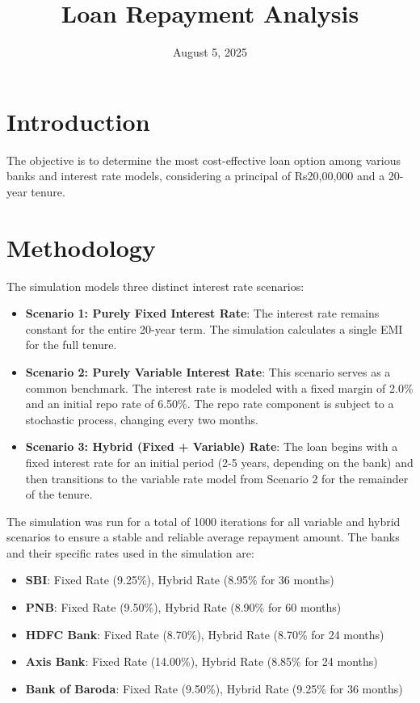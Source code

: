 \documentclass{article}
\title{Loan Repayment Analysis}
\date{August 5, 2025}
\author{}
\begin{document}
\maketitle

\section{Introduction}
The objective is to determine the most cost-effective loan option among various banks and interest rate models, considering a principal of Rs20,00,000 and a 20-year tenure.

\section{Methodology}
The simulation models three distinct interest rate scenarios:

\begin{itemize}
    \item \textbf{Scenario 1: Purely Fixed Interest Rate}: The interest rate remains constant for the entire 20-year term. The simulation calculates a single EMI for the full tenure.
    
    \item \textbf{Scenario 2: Purely Variable Interest Rate}: This scenario serves as a common benchmark. The interest rate is modeled with a fixed margin of 2.0\% and an initial repo rate of 6.50\%. The repo rate component is subject to a stochastic process, changing every two months.
    
    \item \textbf{Scenario 3: Hybrid (Fixed + Variable) Rate}: The loan begins with a fixed interest rate for an initial period (2-5 years, depending on the bank) and then transitions to the variable rate model from Scenario 2 for the remainder of the tenure.
\end{itemize}

The simulation was run for a total of 1000 iterations for all variable and hybrid scenarios to ensure a stable and reliable average repayment amount. The banks and their specific rates used in the simulation are:

\begin{itemize}
    \item \textbf{SBI}: Fixed Rate (9.25\%), Hybrid Rate (8.95\% for 36 months)
    \item \textbf{PNB}: Fixed Rate (9.50\%), Hybrid Rate (8.90\% for 60 months)
    \item \textbf{HDFC Bank}: Fixed Rate (8.70\%), Hybrid Rate (8.70\% for 24 months)
    \item \textbf{Axis Bank}: Fixed Rate (14.00\%), Hybrid Rate (8.85\% for 24 months)
    \item \textbf{Bank of Baroda}: Fixed Rate (9.50\%), Hybrid Rate (9.25\% for 36 months)
\end{itemize}
\end{document}
